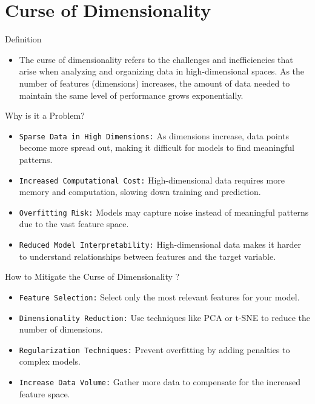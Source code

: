 \documentclass[serif, aspectratio=169]{beamer}
\begin{document}
\section{Curse of Dimensionality}

\begin{frame}{Definition}
    \begin{itemize}
        \item The curse of dimensionality refers to the challenges and inefficiencies that arise when analyzing and organizing data in high-dimensional spaces. As the number of features (dimensions) increases, the amount of data needed to maintain the same level of performance grows exponentially.
    \end{itemize}
\end{frame}

\begin{frame}{Why is it a Problem?}
     \begin{itemize}
        \item \texttt{\color{teal}Sparse Data in High Dimensions:} As dimensions increase, data points become more spread out, making it difficult for models to find meaningful patterns.

        \item \texttt{\color{teal}Increased Computational Cost:} High-dimensional data requires more memory and computation, slowing down training and prediction.

        \item \texttt{\color{teal}Overfitting Risk:} Models may capture noise instead of meaningful patterns due to the vast feature space.

        \item \texttt{\color{teal}Reduced Model Interpretability:} High-dimensional data makes it harder to understand relationships between features and the target variable.
\end{itemize}
\end{frame}

\begin{frame}{How to Mitigate the Curse of Dimensionality ?}
     \begin{itemize}
         \item \texttt{\color{teal}Feature Selection:} 
         Select only the most relevant features for your model.

         \item \texttt{\color{teal}Dimensionality Reduction:} 
         Use techniques like PCA or t-SNE to reduce the number of dimensions.

        \item \texttt{\color{teal}Regularization Techniques:} 
        Prevent overfitting by adding penalties to complex models.

        \item \texttt{\color{teal}Increase Data Volume:} 
        Gather more data to compensate for the increased feature space.
    \end{itemize}
\end{frame}
\end{document}
